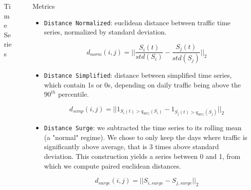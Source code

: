 \documentclass[final]{beamer}
\newlength{\sepwid}
\newlength{\onecolwid}
\newlength{\twocolwid}
\begin{document}
\begin{frame}[t]
\begin{columns}[t]
\begin{column}{\onecolwid}
\begin{block}{Time Series}
\end{block}


\end{column} %

\begin{column}{\sepwid}\end{column} %

\begin{column}{\twocolwid} %

\begin{columns}[t,totalwidth=\twocolwid] %

\begin{column}{\onecolwid}\vspace{-.6in} %


\begin{block}{Metrics}

  \begin{itemize}
  \item \texttt{Distance Normalized}: euclidean distance between traffic time series, normalized by standard deviation.

  $$d_{norm}(i, j) = ||\frac{S_i(t)}{std(S_i)} - \frac{S_j(t)}{std(S_j)}||_2$$

  \item \texttt{Distance Simplified}: distance between simplified time series, which contain 1s or 0s, depending on daily traffic being above the $90^{th}$ percentile.

  $$d_{simp}(i, j) = ||1_{S_i(t) > q_{90\%}(S_i)} - 1_{S_j(t) > q_{90\%}(S_j)}||_2$$

  \item \texttt{Distance Surge}: we subtracted the time series to its rolling mean (a "normal" regime). We chose to only keep the days where traffic is significantly above average, that is 3 times above standard deviation. This construction yields a series between 0 and 1, from which we compute paired euclidean distances.


  $$d_{surge}(i, j) = ||S_{i, surge} - S_{j, surge}||_2$$


\end{itemize}


\end{block}
\end{column}
\end{columns}
\end{column}
\end{columns}
\end{frame}
\end{document}
